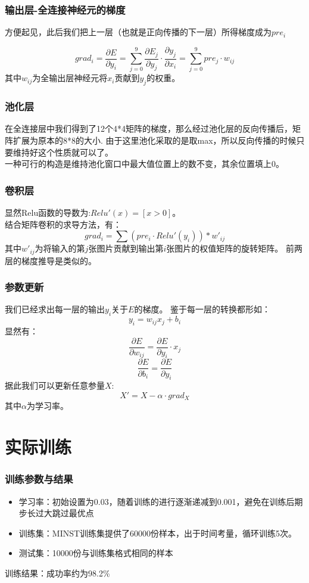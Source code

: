 \documentclass[
aspectratio=169,  %
]{ctexbeamer}
\begin{document}
	\begin{frame}
		\frametitle{输出层-全连接神经元的梯度}
		方便起见，此后我们把上一层（也就是正向传播的下一层）所得梯度成为$pre_i$
	
		$$
		grad_i=\dfrac{\partial{E}}{\partial{y_i}}=\sum_{j=0} ^{9}{\dfrac{\partial{E_j}}{\partial{y_j}}\cdot \dfrac{\partial{y_j}}{\partial{x_i}}}
		=\sum_{j=0} ^{9}{pre_j \cdot w_{ij}}
		$$
		其中$w_{ij}$为全输出层神经元将$x_i$贡献到$y_j$的权重。
	\end{frame}
	
		\begin{frame}
		\frametitle{池化层}
		在全连接层中我们得到了12个4*4矩阵的梯度，那么经过池化层的反向传播后，矩阵扩展为原本的8*8的大小.
		由于这里池化采取的是取max，所以反向传播的时候只要维持好这个性质就可以了。
		\\
		一种可行的构造是维持池化窗口中最大值位置上的数不变，其余位置填上0。	
	\end{frame}
	

	\begin{frame}
	\frametitle{卷积层}	
	显然Relu函数的导数为:$Relu'(x)=[x>0]$。
	\\
	结合矩阵卷积的求导方法，有：
	$$
	grad_i=\sum {(pre_i \cdot {Relu'(y_i)})*w'_{ij}}
	$$
	其中$w'_{ij}$为将输入的第$j$张图片贡献到输出第$i$张图片的权值矩阵的旋转矩阵。
	前两层的梯度推导是类似的。
	\end{frame}
		\begin{frame}
		\frametitle{参数更新}	
		我们已经求出每一层的输出$y_{i}$关于$E$的梯度。
		鉴于每一层的转换都形如：
		$$
		y_i=w_{ij}x_j+b_i
		$$
		显然有：
		$$
		\dfrac{\partial{E}}{\partial{w_{ij}}}=\dfrac{\partial{E}}{\partial{y_i}}\cdot x_j
		$$
		$$
		\dfrac{\partial{E}}{\partial{b_{i}}}=\dfrac{\partial{E}}{\partial{y_i}}
		$$
		据此我们可以更新任意参量$X$:
		$$
			X'=X-\alpha \cdot grad_X
		$$
		其中$\alpha$为学习率。
	\end{frame}
	\section{实际训练}
	\begin{frame}
	\frametitle{训练参数与结果}	
	\begin{itemize}
	\item 学习率：初始设置为0.03，随着训练的进行逐渐递减到0.001，避免在训练后期步长过大跳过最优点
	\item 训练集：MINST训练集提供了60000份样本，出于时间考量，循环训练5次。
	\item 测试集：10000份与训练集格式相同的样本
	\end{itemize}
	训练结果：成功率约为98.2\%
	\end{frame}
\end{document}

